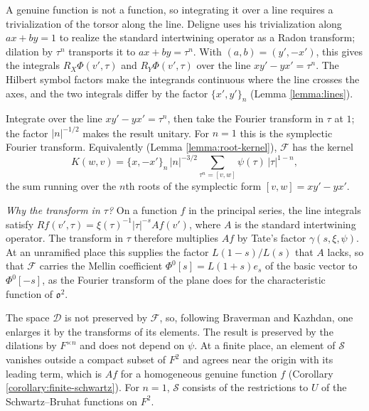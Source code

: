 \begin{sketch}
  A genuine function is not a function, so integrating it over a line requires a trivialization of the torsor along the line.  Deligne uses his trivialization along $a x + b y = 1$ to realize the standard intertwining operator as a Radon transform; dilation by $\tau^n$ transports it to $a x + b y = \tau^n$.  With $(a, b) = (y', -x')$, this gives the integrals $R_X \Phi(v', \tau)$ and $R_Y \Phi(v', \tau)$ over the line $x y' - y x' = \tau^n$.  The Hilbert symbol factors make the integrands continuous where the line crosses the axes, and the two integrals differ by the factor $\{x', y'\}_n$ (Lemma \ref{lemma:lines}).
\end{sketch}

\begin{sketch}
  Integrate over the line $x y' - y x' = \tau^n$, then take the Fourier transform in $\tau$ at $1$; the factor $\lvert n \rvert^{-1/2}$ makes the result unitary.  For $n = 1$ this is the symplectic Fourier transform.  Equivalently (Lemma \ref{lemma:root-kernel}), $\mathcal{F}$ has the kernel
  \[
    K(w, v) = \{x, -x'\}_n \, \lvert n \rvert^{-3/2} \sum_{\tau^n = [v, w]} \psi(\tau) \, \lvert \tau \rvert^{1-n},
  \]
  the sum running over the $n$th roots of the symplectic form $[v, w] = x y' - y x'$.

  \emph{Why the transform in $\tau$?}  On a function $f$ in the principal series, the line integrals satisfy $R f(v', \tau) = \xi(\tau)^{-1} \lvert \tau \rvert^{-s} A f(v')$, where $A$ is the standard intertwining operator.  The transform in $\tau$ therefore multiplies $A f$ by Tate's factor $\gamma(s, \xi, \psi)$.  At an unramified place this supplies the factor $L(1 - s) / L(s)$ that $A$ lacks, so that $\mathcal{F}$ carries the Mellin coefficient $\Phi^0[s] = L(1 + s) e_s$ of the basic vector to $\Phi^0[-s]$, as the Fourier transform of the plane does for the characteristic function of $\mathfrak{o}^2$.
\end{sketch}

\begin{sketch}
  The space $\mathcal{D}$ is not preserved by $\mathcal{F}$, so, following Braverman and Kazhdan, one enlarges it by the transforms of its elements.  The result is preserved by the dilations by $F^{\times n}$ and does not depend on $\psi$.  At a finite place, an element of $\mathcal{S}$ vanishes outside a compact subset of $F^2$ and agrees near the origin with its leading term, which is $A f$ for a homogeneous genuine function $f$ (Corollary \ref{corollary:finite-schwartz}).  For $n = 1$, $\mathcal{S}$ consists of the restrictions to $U$ of the Schwartz--Bruhat functions on $F^2$.
\end{sketch}

